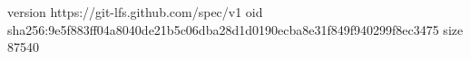 version https://git-lfs.github.com/spec/v1
oid sha256:9e5f883ff04a8040de21b5c06dba28d1d0190ecba8e31f849f940299f8ec3475
size 87540
